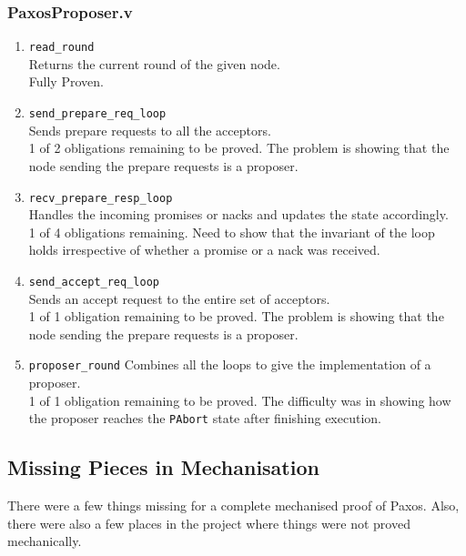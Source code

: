 \subsubsection{PaxosProposer.v}
\begin{enumerate}
  \item \texttt{read\_round} \\
    Returns the current round of the given node. \\
    Fully Proven.
  \item \texttt{send\_prepare\_req\_loop} \\
    Sends prepare requests to all the acceptors. \\
    1 of 2 obligations remaining to be proved. The problem is showing that
    the node sending the prepare requests is a proposer.
  \item \texttt{recv\_prepare\_resp\_loop} \\
    Handles the incoming promises or nacks and updates the state accordingly. \\
    1 of 4 obligations remaining. Need to show that the invariant of the loop holds
    irrespective of whether a promise or a nack was received.
  \item \texttt{send\_accept\_req\_loop} \\
    Sends an accept request to the entire set of acceptors. \\
    1 of 1 obligation remaining to be proved. The problem is showing that
    the node sending the prepare requests is a proposer.
  \item \texttt{proposer\_round}
  Combines all the loops to give the implementation of a proposer. \\
  1 of 1 obligation remaining to be proved. The difficulty was in showing how
  the proposer reaches the \texttt{PAbort} state after finishing execution.
\end{enumerate}

\vspace{-5mm}
\subsection{Missing Pieces in Mechanisation}
There were a few things missing for a complete mechanised proof of Paxos.
Also, there were also a few places in the project where things
were not proved mechanically.

